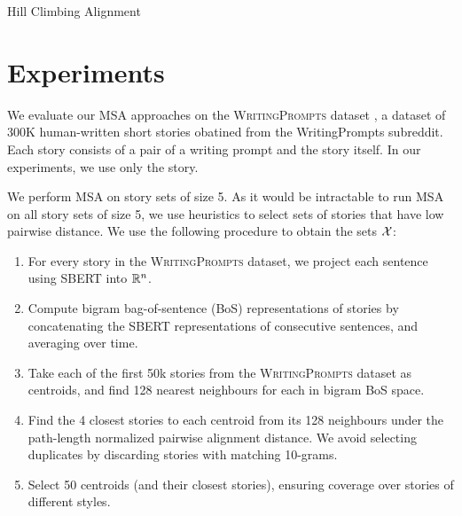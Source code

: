 \documentclass{article}
\begin{document}
\begin{algorithm}[h]
\begin{algorithmic}
    \EndFor
    \State{}
    \ForAll{}
    \EndFor
    \ForAll{}
    \EndFor
\EndFor
{}
\end{algorithmic}
\caption{\label{alg:hillclimbing}
Hill Climbing Alignment
}
\end{algorithm}

\section{Experiments}
We evaluate our MSA approaches on the \textsc{WritingPrompts} dataset \citep{fan2018writingprompts},
a dataset of 300K human-written short stories obatined from the WritingPrompts subreddit.
Each story consists of a pair of a writing prompt and the story itself.
In our experiments, we use only the story.

We perform MSA on story sets of size 5.
As it would be intractable to run MSA on all story sets of size 5,
we use heuristics to select sets of stories that have low pairwise distance.
We use the following procedure to obtain the sets $\mathcal{X}$:
\begin{enumerate}
\item For every story in the \textsc{WritingPrompts} dataset,
we project each sentence using SBERT \citep{reimers2019sbert} into $\mathbb{R}^n$.
\item Compute bigram bag-of-sentence (BoS) representations of stories by
concatenating the SBERT representations of consecutive sentences, and averaging over time.
\item Take each of the first 50k stories from the \textsc{WritingPrompts} dataset as centroids,
and find 128 nearest neighbours for each in bigram BoS space.
\item Find the 4 closest stories to each centroid from its 128 neighbours
under the path-length normalized pairwise alignment distance.
We avoid selecting duplicates by discarding stories with matching 10-grams.
\item Select 50 centroids (and their closest stories), ensuring 
coverage over stories of different styles.
\end{enumerate}
\end{document}
